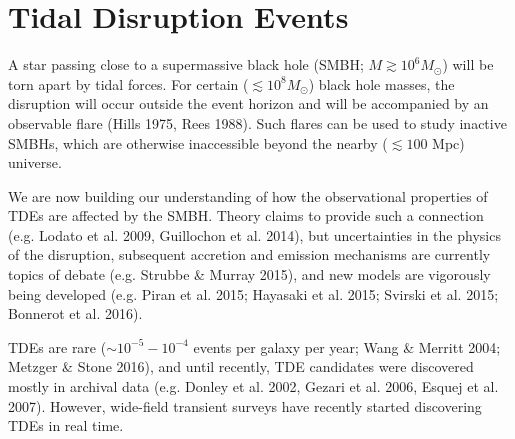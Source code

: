 %
%
%
%
%
%
%
%

\section{Tidal Disruption Events}
\def\secname{tdes}\label{sec:\secname} %


A star passing close to a supermassive black hole (SMBH; $M\gtrsim10^{6}M_{\odot}$)
will be torn apart by tidal forces. For certain ($\lesssim10^{8}M_{\odot}$)
black hole masses, the disruption will occur outside the event horizon
and will be accompanied by an observable flare (Hills 1975, Rees 1988).
Such flares can be used to study inactive SMBHs, which are otherwise
inaccessible beyond the nearby ($\lesssim100$ Mpc) universe. 

We are now building our understanding of how the observational
properties of TDEs are affected by the SMBH. Theory claims to provide
such a connection (e.g. Lodato et al. 2009, Guillochon et al. 2014),
but uncertainties in the physics of the disruption, subsequent accretion
and emission mechanisms are currently topics of debate (e.g. Strubbe \&
Murray 2015), and new models are vigorously being developed (e.g.
Piran et al. 2015; Hayasaki et al. 2015; Svirski et al. 2015; Bonnerot
et al. 2016). 

TDEs are rare ($\sim10^{-5}-10^{-4}$ events per galaxy per year; Wang \& Merritt 2004; 
Metzger \& Stone 2016), and until recently, TDE candidates were discovered 
mostly in archival data (e.g. Donley et al. 2002, Gezari
et al. 2006, Esquej et al. 2007). However, wide-field transient
surveys have recently started discovering TDEs in real time.

